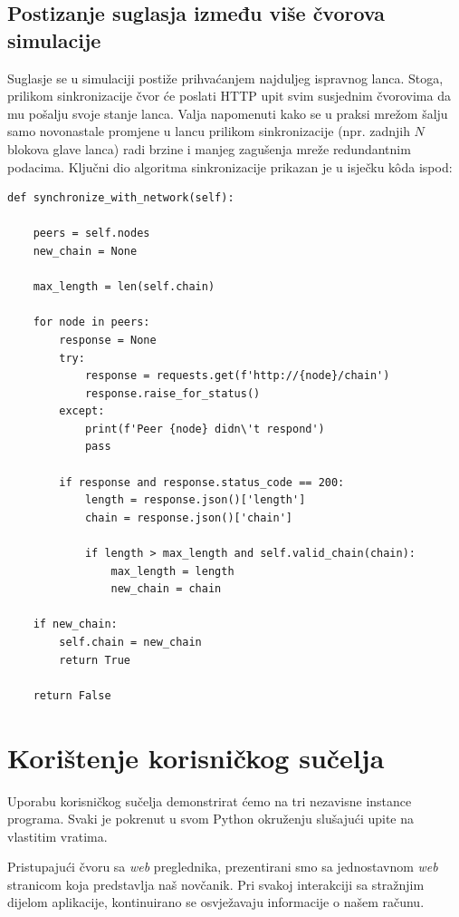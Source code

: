 \documentclass[utf8, zavrsni]{fer}
\begin{document}
\section{Postizanje suglasja između više čvorova simulacije}
Suglasje se u simulaciji postiže prihvaćanjem najduljeg ispravnog lanca. Stoga, prilikom sinkronizacije čvor će poslati HTTP upit svim susjednim čvorovima da mu pošalju svoje stanje lanca. Valja napomenuti kako se u praksi mrežom šalju samo novonastale promjene u lancu prilikom sinkronizacije (npr. zadnjih $ N $ blokova glave lanca) radi brzine i manjeg zagušenja mreže redundantnim podacima. Ključni dio algoritma sinkronizacije prikazan je u isječku kôda ispod:

\begin{verbatim}
def synchronize_with_network(self):

    peers = self.nodes
    new_chain = None

    max_length = len(self.chain)

    for node in peers:
        response = None
        try:
            response = requests.get(f'http://{node}/chain')
            response.raise_for_status()
        except:
            print(f'Peer {node} didn\'t respond')
            pass

        if response and response.status_code == 200:
            length = response.json()['length']
            chain = response.json()['chain']

            if length > max_length and self.valid_chain(chain):
                max_length = length
                new_chain = chain

    if new_chain:
        self.chain = new_chain
        return True

    return False
\end{verbatim}

\chapter{Korištenje korisničkog sučelja}
Uporabu korisničkog sučelja demonstrirat ćemo na tri nezavisne instance programa. Svaki je pokrenut u svom Python okruženju slušajući upite na vlastitim vratima.

Pristupajući čvoru sa \textit{web} preglednika, prezentirani smo sa jednostavnom \textit{web} stranicom koja predstavlja naš novčanik. Pri svakoj interakciji sa stražnjim dijelom aplikacije, kontinuirano se osvježavaju informacije o našem računu.
\end{document}
